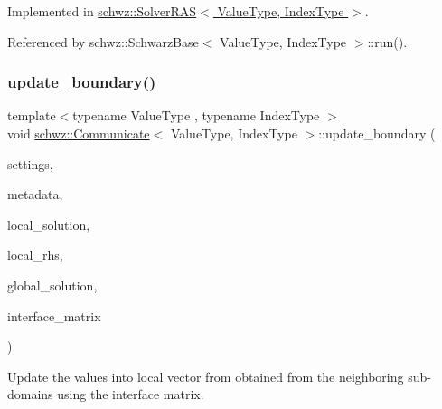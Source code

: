 Implemented in \hyperlink{classschwz_1_1SolverRAS_a8cd640aa073c0890d6121dc3afb3eaac}{schwz\+::\+Solver\+R\+A\+S$<$ Value\+Type, Index\+Type $>$}.



Referenced by schwz\+::\+Schwarz\+Base$<$ Value\+Type, Index\+Type $>$\+::run().

\mbox{\label{classschwz_1_1Communicate_aa1332376dfc67f5384527be90df7cbea}} 
\subsubsection{\texorpdfstring{update\+\_\+boundary()}{update\_boundary()}}
{\footnotesize\ttfamily template$<$typename Value\+Type , typename Index\+Type $>$ \\
void \hyperlink{classschwz_1_1Communicate}{schwz\+::\+Communicate}$<$ Value\+Type, Index\+Type $>$\+::update\+\_\+boundary (\begin{DoxyParamCaption}\item[{const \hyperlink{structschwz_1_1Settings}{Settings} \&}]{settings,  }\item[{const \hyperlink{structschwz_1_1Metadata}{Metadata}$<$ Value\+Type, Index\+Type $>$ \&}]{metadata,  }\item[{std\+::shared\+\_\+ptr$<$ gko\+::matrix\+::\+Dense$<$ Value\+Type $>$$>$ \&}]{local\+\_\+solution,  }\item[{const std\+::shared\+\_\+ptr$<$ gko\+::matrix\+::\+Dense$<$ Value\+Type $>$$>$ \&}]{local\+\_\+rhs,  }\item[{const std\+::shared\+\_\+ptr$<$ gko\+::matrix\+::\+Dense$<$ Value\+Type $>$$>$ \&}]{global\+\_\+solution,  }\item[{const std\+::shared\+\_\+ptr$<$ gko\+::matrix\+::\+Csr$<$ Value\+Type, Index\+Type $>$$>$ \&}]{interface\+\_\+matrix }\end{DoxyParamCaption})\hspace{0.3cm}{\ttfamily [pure virtual]}}



Update the values into local vector from obtained from the neighboring sub-\/domains using the interface matrix. 


